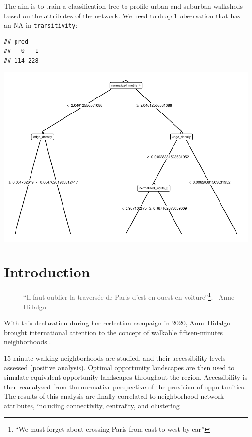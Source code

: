 \documentclass[preprint, 3p,
authoryear]{elsarticle} %
\begin{document}
The aim is to train a classification tree to profile urban and suburban
walksheds based on the attributes of the network. We need to drop 1
observation that has an NA in \texttt{transitivity}:

\begin{verbatim}
## pred
##   0   1 
## 114 228
\end{verbatim}

\includegraphics{paper_files/figure-latex/unnamed-chunk-3-1.pdf}

\section{Introduction}\label{introduction}

\begin{quote}
``Il faut oublier la traversée de Paris d'est en ouest en
voiture''\footnote{ ``We must forget about crossing Paris from east to
  west by car''}. --Anne Hidalgo
\end{quote}

With this declaration during her reelection campaign in 2020, Anne
Hidalgo brought international attention to the concept of walkable
fifteen-minutes neighborhoods \citep{alimi2020}.

\citet{knight2018walkable} \citet{liu2022toward}
\citet{pozoukidou2021fifteen} \citet{weng2019fifteen}

15-minute walking neighborhoods are studied, and their accessibility
levels assessed (positive analysis). Optimal opportunity landscapes are
then used to simulate equivalent opportunity landscapes throughout the
region. Accessibility is then reanalyzed from the normative perspective
of the provision of opportunities. The results of this analysis are
finally correlated to neighborhood network attributes, including
connectivity, centrality, and clustering
\end{document}
